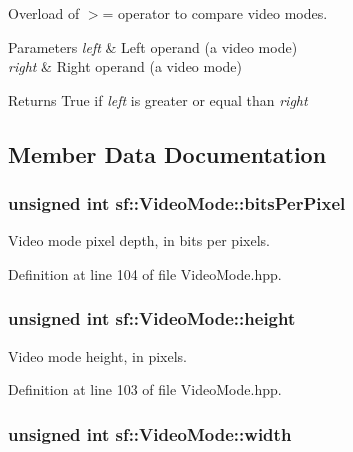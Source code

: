 Overload of $>$= operator to compare video modes. 


\begin{DoxyParams}{Parameters}
{\em left} & Left operand (a video mode) \\
\hline
{\em right} & Right operand (a video mode)\\
\hline
\end{DoxyParams}
\begin{DoxyReturn}{Returns}
True if {\itshape left} is greater or equal than {\itshape right} 
\end{DoxyReturn}


\subsection{Member Data Documentation}
\hypertarget{classsf_1_1_video_mode_aa080f1ef96a1008d58b1920eceb189df}{
\subsubsection[{bits\-Per\-Pixel}]{\setlength{\rightskip}{0pt plus 5cm}unsigned int sf\-::\-Video\-Mode\-::bits\-Per\-Pixel}}\label{classsf_1_1_video_mode_aa080f1ef96a1008d58b1920eceb189df}


Video mode pixel depth, in bits per pixels. 



Definition at line 104 of file Video\-Mode.\-hpp.

\hypertarget{classsf_1_1_video_mode_a5a88d44c9470db7474361a42a189342d}{
\subsubsection[{height}]{\setlength{\rightskip}{0pt plus 5cm}unsigned int sf\-::\-Video\-Mode\-::height}}\label{classsf_1_1_video_mode_a5a88d44c9470db7474361a42a189342d}


Video mode height, in pixels. 



Definition at line 103 of file Video\-Mode.\-hpp.

\hypertarget{classsf_1_1_video_mode_a9b3b2ad2cac6b9c266823fb5ed506d90}{
\subsubsection[{width}]{\setlength{\rightskip}{0pt plus 5cm}unsigned int sf\-::\-Video\-Mode\-::width}}\label{classsf_1_1_video_mode_a9b3b2ad2cac6b9c266823fb5ed506d90}


